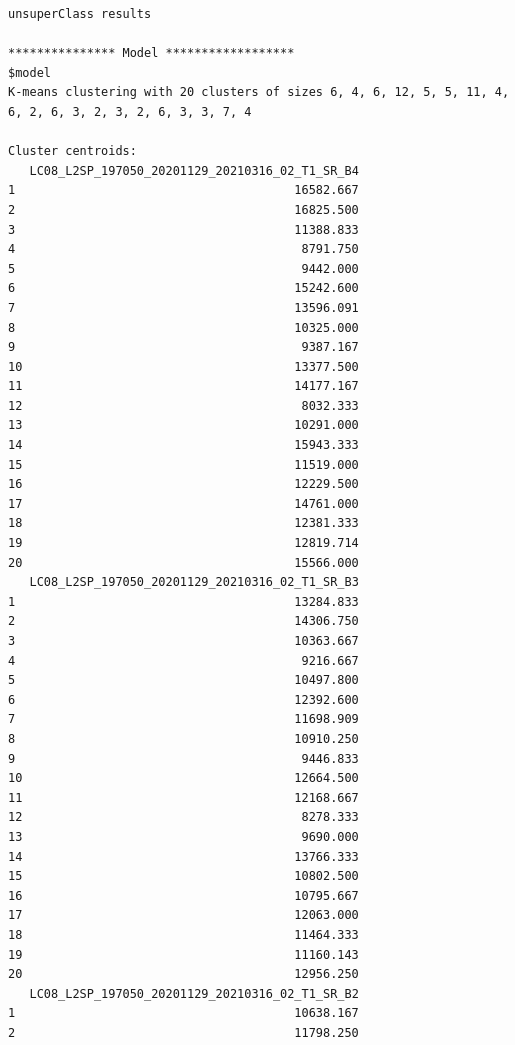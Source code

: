 \documentclass[12pt,a4paper,oneside]{article}
\begin{document}
\begin{scriptsize}
\begin{verbatim}
unsuperClass results

*************** Model ******************
$model
K-means clustering with 20 clusters of sizes 6, 4, 6, 12, 5, 5, 11, 4, 6, 2, 6, 3, 2, 3, 2, 6, 3, 3, 7, 4

Cluster centroids:
   LC08_L2SP_197050_20201129_20210316_02_T1_SR_B4
1                                       16582.667
2                                       16825.500
3                                       11388.833
4                                        8791.750
5                                        9442.000
6                                       15242.600
7                                       13596.091
8                                       10325.000
9                                        9387.167
10                                      13377.500
11                                      14177.167
12                                       8032.333
13                                      10291.000
14                                      15943.333
15                                      11519.000
16                                      12229.500
17                                      14761.000
18                                      12381.333
19                                      12819.714
20                                      15566.000
   LC08_L2SP_197050_20201129_20210316_02_T1_SR_B3
1                                       13284.833
2                                       14306.750
3                                       10363.667
4                                        9216.667
5                                       10497.800
6                                       12392.600
7                                       11698.909
8                                       10910.250
9                                        9446.833
10                                      12664.500
11                                      12168.667
12                                       8278.333
13                                       9690.000
14                                      13766.333
15                                      10802.500
16                                      10795.667
17                                      12063.000
18                                      11464.333
19                                      11160.143
20                                      12956.250
   LC08_L2SP_197050_20201129_20210316_02_T1_SR_B2
1                                       10638.167
2                                       11798.250

\end{verbatim}
\end{scriptsize}
\end{document}
